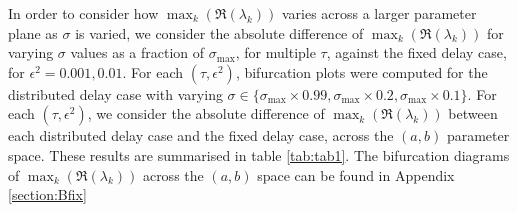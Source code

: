 In order to consider how $\max_k(\Re(\lambda_k))$ varies across a larger parameter plane as $\sigma$ is varied, we consider the absolute difference of $\max_k(\Re(\lambda_k))$ for varying $\sigma$ values as a fraction of $\sigma_{\max}$, for multiple $\tau$, against the fixed delay case, for $\epsilon^2=0.001,0.01$. For each $(\tau,\epsilon^2)$, bifurcation plots were computed for the distributed delay case with varying $\sigma\in\{\sigma_{\max}\times0.99,\sigma_{\max}\times0.2,\sigma_{\max}\times0.1\}$. For each $(\tau,\epsilon^2)$, we consider the absolute difference of $\max_k(\Re(\lambda_k))$ between each distributed delay case and the fixed delay case, across the $(a,b)$ parameter space. These results are summarised in table \ref{tab:tab1}. The bifurcation diagrams of $\max_k(\Re(\lambda_k))$ across the $(a,b)$ space can be found in Appendix \ref{section:Bfix}

